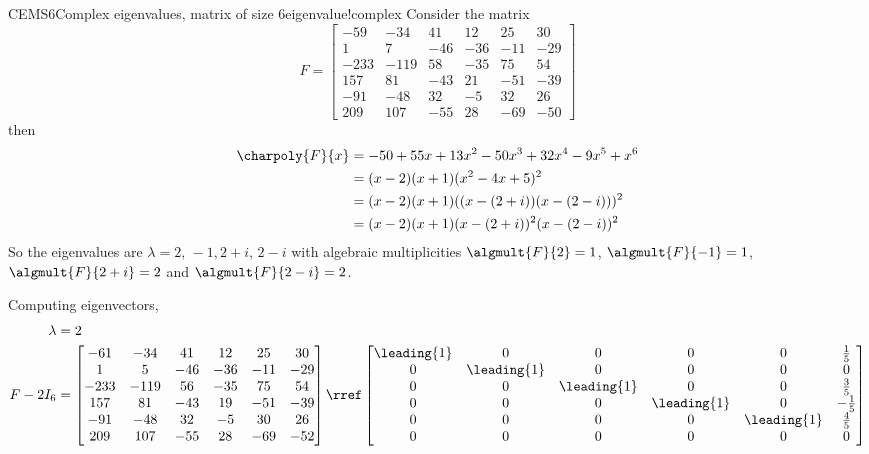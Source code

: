 \begin{example}{CEMS6}{Complex eigenvalues, matrix of size 6}{eigenvalue!complex}
Consider the matrix
%
\begin{equation*}
F=
\begin{bmatrix}
-59 & -34 & 41 & 12 & 25 & 30\\
1 & 7 & -46 & -36 & -11 & -29\\
-233 & -119 & 58 & -35 & 75 & 54\\
157 & 81 & -43 & 21 & -51 & -39\\
-91 & -48 & 32 & -5 & 32 & 26\\
209 & 107 & -55 & 28 & -69 & -50
\end{bmatrix}
\end{equation*}
%
then
%
\begin{align*}
\charpoly{F}{x}&=-50+55x+13x^2-50x^3+32x^4-9x^5+x^6\\
 &=(x-2)(x+1)(x^2-4x+5)^2\\
 &=(x-2)(x+1)((x-(2+i))(x-(2-i)))^2\\
 &=(x-2)(x+1)(x-(2+i))^2(x-(2-i))^2\\
\end{align*}
%
So the eigenvalues are $\lambda=2,\,-1,2+i,\,2-i$ with algebraic multiplicities $\algmult{F}{2}=1$, $\algmult{F}{-1}=1$, $\algmult{F}{2+i}=2$ and $\algmult{F}{2-i}=2$.\par
%
Computing eigenvectors,
%
\begin{align*}
\lambda&=2\\
F-2I_6&=
\begin{bmatrix}
-61 & -34 & 41 & 12 & 25 & 30\\
1 & 5 & -46 & -36 & -11 & -29\\
-233 & -119 & 56 & -35 & 75 & 54\\
157 & 81 & -43 & 19 & -51 & -39\\
-91 & -48 & 32 & -5 & 30 & 26\\
209 & 107 & -55 & 28 & -69 & -52
\end{bmatrix}
\rref
\begin{bmatrix}
\leading{1} & 0 & 0 & 0 & 0 & \frac{1}{5}\\
0 & \leading{1} & 0 & 0 & 0 & 0\\
0 & 0 & \leading{1} & 0 & 0 & \frac{3}{5}\\
0 & 0 & 0 & \leading{1} & 0 & -\frac{1}{5}\\
0 & 0 & 0 & 0 & \leading{1} & \frac{4}{5}\\
0 & 0 & 0 & 0 & 0 & 0
\end{bmatrix}\\

\end{align*}
\end{example}
